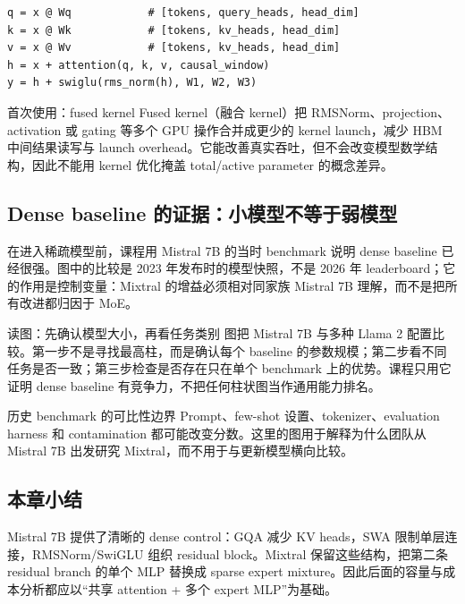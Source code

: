 \begin{lstlisting}[caption={Dense Transformer block 的 shape-first 伪代码}]
q = x @ Wq            # [tokens, query_heads, head_dim]
k = x @ Wk            # [tokens, kv_heads, head_dim]
v = x @ Wv            # [tokens, kv_heads, head_dim]
h = x + attention(q, k, v, causal_window)
y = h + swiglu(rms_norm(h), W1, W2, W3)
\end{lstlisting}

\begin{knowledgebox}{首次使用：fused kernel}
Fused kernel（融合 kernel）把 RMSNorm、projection、activation 或 gating 等多个 GPU 操作合并成更少的 kernel launch，减少 HBM 中间结果读写与 launch overhead。它能改善真实吞吐，但不会改变模型数学结构，因此不能用 kernel 优化掩盖 total/active parameter 的概念差异。
\end{knowledgebox}


\subsection{Dense baseline 的证据：小模型不等于弱模型}

在进入稀疏模型前，课程用 Mistral 7B 的当时 benchmark 说明 dense baseline 已经很强。图中的比较是 2023 年发布时的模型快照，不是 2026 年 leaderboard；它的作用是控制变量：Mixtral 的增益必须相对同家族 Mistral 7B 理解，而不是把所有改进都归因于 MoE。


\begin{knowledgebox}{读图：先确认模型大小，再看任务类别}
图把 Mistral 7B 与多种 Llama 2 配置比较。第一步不是寻找最高柱，而是确认每个 baseline 的参数规模；第二步看不同任务是否一致；第三步检查是否存在只在单个 benchmark 上的优势。课程只用它证明 dense baseline 有竞争力，不把任何柱状图当作通用能力排名。
\end{knowledgebox}

\begin{warningbox}{历史 benchmark 的可比性边界}
Prompt、few-shot 设置、tokenizer、evaluation harness 和 contamination 都可能改变分数。这里的图用于解释为什么团队从 Mistral 7B 出发研究 Mixtral，而不用于与更新模型横向比较。
\end{warningbox}

\subsection{本章小结}

Mistral 7B 提供了清晰的 dense control：GQA 减少 KV heads，SWA 限制单层连接，RMSNorm/SwiGLU 组织 residual block。Mixtral 保留这些结构，把第二条 residual branch 的单个 MLP 替换成 sparse expert mixture。因此后面的容量与成本分析都应以“共享 attention + 多个 expert MLP”为基础。

